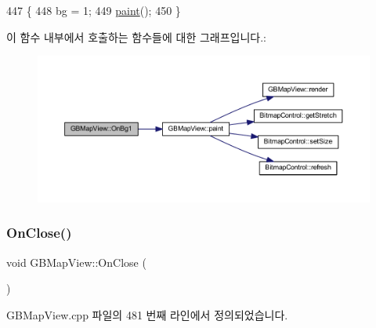 \begin{DoxyCode}
447 \{
448   bg = 1;
449   \mbox{\hyperlink{class_g_b_map_view_a42de669273417186b01ca6f8d06eb347}{paint}}();
450 \}
\end{DoxyCode}
이 함수 내부에서 호출하는 함수들에 대한 그래프입니다.\+:
\nopagebreak
\begin{figure}[H]
\begin{center}
\leavevmode
\includegraphics[width=350pt]{class_g_b_map_view_a8cbe9a5f305ebaff40a3a345f444ef98_cgraph}
\end{center}
\end{figure}
\mbox{\label{class_g_b_map_view_a71cb2125ab0c6216749d128c16d37bff}} 
\subsubsection{\texorpdfstring{On\+Close()}{OnClose()}}
{\footnotesize\ttfamily void G\+B\+Map\+View\+::\+On\+Close (\begin{DoxyParamCaption}{ }\end{DoxyParamCaption})\hspace{0.3cm}{\ttfamily [protected]}}



G\+B\+Map\+View.\+cpp 파일의 481 번째 라인에서 정의되었습니다.


